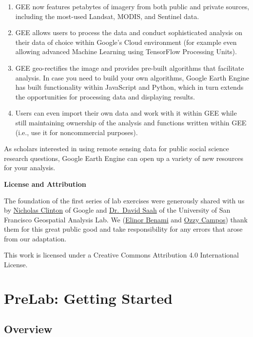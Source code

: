 \documentclass[
]{article}
\providecommand{\tightlist}{%
  \setlength{\itemsep}{0pt}\setlength{\parskip}{0pt}}
\begin{document}
\begin{enumerate}
\def\labelenumi{\arabic{enumi}.}
\tightlist
\item
  GEE now features petabytes of imagery from both public and private sources, including the most-used Landsat, MODIS, and Sentinel data.
\item
  GEE allows users to process the data and conduct sophisticated analysis on their data of choice within Google's Cloud environment (for example even allowing advanced Machine Learning using TensorFlow Processing Units).
\item
  GEE geo-rectifies the image and provides pre-built algorithms that facilitate analysis. In case you need to build your own algorithms, Google Earth Engine has built functionality within JavaScript and Python, which in turn extends the opportunities for processing data and displaying results.
\item
  Users can even import their own data and work with it within GEE while still maintaining ownership of the analysis and functions written within GEE (i.e., use it for noncommercial purposes).
\end{enumerate}

As scholars interested in using remote sensing data for public social science research questions, Google Earth Engine can open up a variety of new resources for your analysis.

\textbf{License and Attribution}

The foundation of the first series of lab exercises were generously shared with us by \href{https://research.google/people/NicholasEtienneClinton/}{Nicholas Clinton} of Google and \href{https://www.usfca.edu/faculty/david-saah}{Dr.~David Saah} of the University of San Francisco Geospatial Analysis Lab. We (\href{https://www.ebenami.com/}{Elinor Benami} and \href{https://ozzycampos.com/}{Ozzy Campos}) thank them for this great public good and take responsibility for any errors that arose from our adaptation.

This work is licensed under a Creative Commons Attribution 4.0 International License.

\hypertarget{prelab-getting-started}{%
\section*{PreLab: Getting Started}\label{prelab-getting-started}}

\hypertarget{overview}{%
\subsection*{Overview}\label{overview}}
\end{document}
